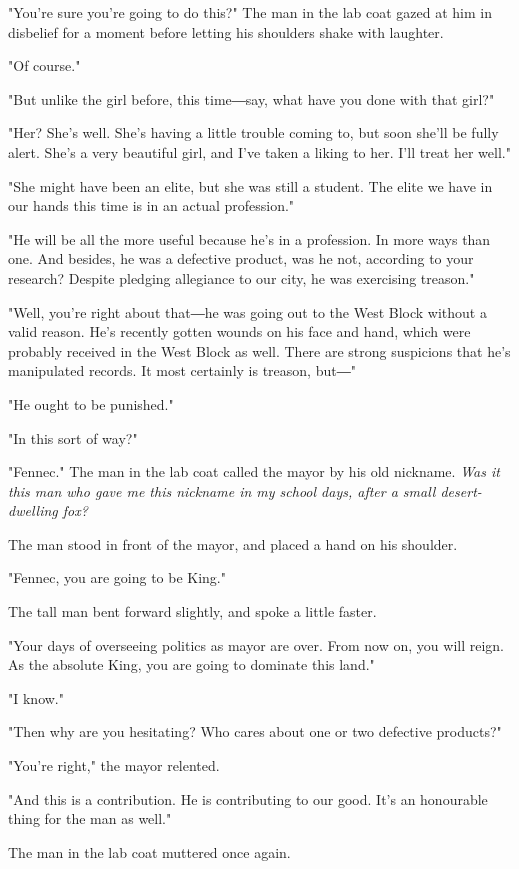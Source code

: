 "You're sure you're going to do this?" The man in the lab coat gazed at
him in disbelief for a moment before letting his shoulders shake with
laughter.

"Of course."

"But unlike the girl before, this time―say, what have you done with that
girl?"

"Her? She's well. She's having a little trouble coming to, but soon
she'll be fully alert. She's a very beautiful girl, and I've taken a
liking to her. I'll treat her well."

"She might have been an elite, but she was still a student. The elite we
have in our hands this time is in an actual profession."

"He will be all the more useful because he's in a profession. In more
ways than one. And besides, he was a defective product, was he not,
according to your research? Despite pledging allegiance to our city, he
was exercising treason."

"Well, you're right about that―he was going out to the West Block
without a valid reason. He's recently gotten wounds on his face and
hand, which were probably received in the West Block as well. There are
strong suspicions that he's manipulated records. It most certainly is
treason, but―"

"He ought to be punished."

"In this sort of way?"

"Fennec." The man in the lab coat called the mayor by his old nickname.
\emph{Was it this man who gave me this nickname in my school days, after a
small desert-dwelling fox?}

The man stood in front of the mayor, and placed a hand on his shoulder.

"Fennec, you are going to be King."

The tall man bent forward slightly, and spoke a little faster.

"Your days of overseeing politics as mayor are over. From now on, you
will reign. As the absolute King, you are going to dominate this land."

"I know."

"Then why are you hesitating? Who cares about one or two defective
products?"

"You're right," the mayor relented.

"And this is a contribution. He is contributing to our good. It's an
honourable thing for the man as well."

The man in the lab coat muttered once again.

